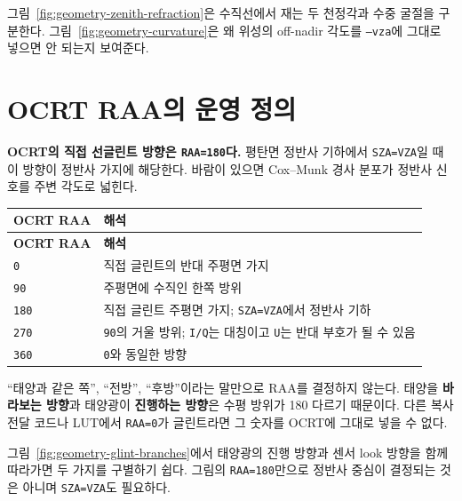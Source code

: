 그림~\ref{fig:geometry-zenith-refraction}은 수직선에서 재는 두 천정각과 수중 굴절을 구분한다. 그림~\ref{fig:geometry-curvature}은 왜 위성의 off-nadir 각도를 \texttt{--vza}에 그대로 넣으면 안 되는지 보여준다.




\section{OCRT RAA의 운영 정의}
\label{sec:auto:01_concepts_geometry:4}
\textbf{OCRT의 직접 선글린트 방향은 \texttt{RAA=\allowbreak{}180\textdegree{}}다.} 평탄면 정반사 기하에서 \texttt{SZA=\allowbreak{}VZA}일 때 이 방향이 정반사 가지에 해당한다. 바람이 있으면 Cox--Munk 경사 분포가 정반사 신호를 주변 각도로 넓힌다.


{\TableFont
\begin{longtable}{@{}>{\raggedright\arraybackslash}p{}>{\raggedright\arraybackslash}p{}@{}}
\toprule
\textbf{OCRT RAA} & \textbf{해석} \\
\midrule
\endfirsthead
\toprule
\textbf{OCRT RAA} & \textbf{해석} \\
\midrule
\endhead
\bottomrule
\endfoot
\texttt{0\textdegree{}} & 직접 글린트의 반대 주평면 가지 \\
\texttt{90\textdegree{}} & 주평면에 수직인 한쪽 방위 \\
\texttt{180\textdegree{}} & 직접 글린트 주평면 가지; \texttt{SZA=\allowbreak{}VZA}에서 정반사 기하 \\
\texttt{270\textdegree{}} & \texttt{90\textdegree{}}의 거울 방위; \texttt{I/\allowbreak{}Q}는 대칭이고 \texttt{U}는 반대 부호가 될 수 있음 \\
\texttt{360\textdegree{}} & \texttt{0\textdegree{}}와 동일한 방향 \\
\end{longtable}
}

“태양과 같은 쪽”, “전방”, “후방”이라는 말만으로 RAA를 결정하지 않는다. 태양을 \textbf{바라보는 방향}과 태양광이 \textbf{진행하는 방향}은 수평 방위가 180\textdegree{} 다르기 때문이다. 다른 복사전달 코드나 LUT에서 \texttt{RAA=\allowbreak{}0\textdegree{}}가 글린트라면 그 숫자를 OCRT에 그대로 넣을 수 없다.

그림~\ref{fig:geometry-glint-branches}에서 태양광의 진행 방향과 센서 look 방향을 함께 따라가면 두 가지를 구별하기 쉽다. 그림의 \texttt{RAA=180\textdegree{}}만으로 정반사 중심이 결정되는 것은 아니며 \texttt{SZA=VZA}도 필요하다.

